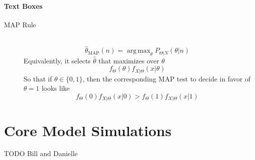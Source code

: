 \documentclass[smallextended]{svjour3}
\newcommand{\od}[3][]{\ensuremath{\frac{\mathrm{d}^{#1} {#2}}{\mathrm{d}{#3}^{#1}}}}
\newcommand{\todo}[1]{{\huge\color{red}TODO {#1}}}
\newcommand{\TwoNote}[4]{$$\text{Note:}\quad\left\{\begin{aligned} {#1} \text{\quad #2} \\
{#3} \text{\quad #4} \\ \end{aligned}\right\}.$$}
\newcommand{\OneNote}[2]{$$\text{Note:}\quad\left\{\begin{aligned} {#1} \text{\quad #2} \end{aligned}\right\}.$$}
\newcommand{\ZeroNote}[1]{$$\text{Note:}\quad\left\{\begin{aligned} {#1} \end{aligned}\right\}.$$}
\DeclareMathOperator*{\argmax}{arg\,max}
\begin{document}
%
%                                                                   
\paragraph{Text Boxes}                                               %
\begin{mdframed}[backgroundcolor=white]                              
 \begin{description}
  \item[MAP Rule] \hfill \\
    $$\hat{\theta}_{\text{MAP}}(n) = \argmax_{\theta}
    P_{\Theta|N}(\theta|n)$$
    Equivalently, it selects $\hat{\theta}$ that maximizes
    over $\theta$
    $$f_{\Theta}(\theta)f_{X|\Theta}(x|\theta)$$
    So that if $\theta\in\{0,1\}$, then the corresponding MAP
    test to decide in favor of $\theta=1$ looks like
    $$f_{\Theta}(0)f_{X|\Theta}(x|0) >
    f_{\Theta}(1)f_{X|\Theta}(x|1)$$
  \end{description}
\end{mdframed}
\section{Core Model Simulations}
\todo{Bill and Danielle}
\label{sec:5}
\end{document}
